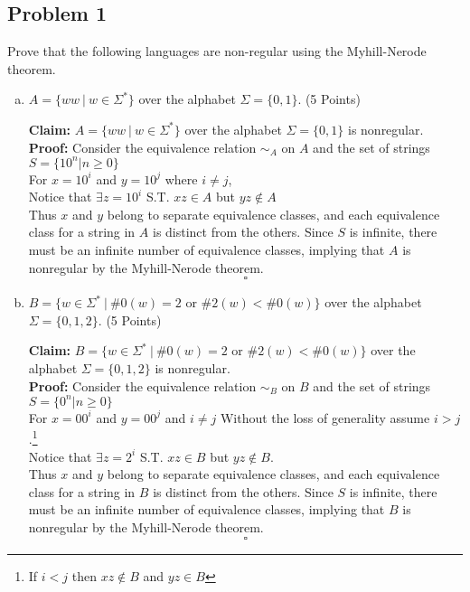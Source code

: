 \documentclass{article}
\begin{document}
\subsection*{Problem 1}
Prove that the following languages are non-regular using the Myhill-Nerode theorem.
\begin{enumerate}[(a)]

\item $A = \{ww\ |\ w \in \Sigma^*\}$ over the alphabet $\Sigma = \{0,1\}$. (5 Points)

\textbf{Claim:}
    $A = \{ww\ |\ w \in \Sigma^*\}$ over the alphabet $\Sigma = \{0,1\}$ is nonregular.\\
\textbf{Proof:}
    Consider the equivalence relation $\sim_A$ on $A$ and the set of strings \\
    $S = \{10^n | n \geq 0 \}$ \\
    For $x = 10^i$ and $y = 10^j$ where $i \neq j$, \\
    Notice that $\exists z = 10^i$ S.T. $xz \in A$ but
    $yz \notin A$ \\
    Thus $x$ and $y$ belong to separate equivalence classes,
    and each equivalence class for a string in
    $A$ is distinct from the others. Since $S$ is infinite, there must be an infinite number of
    equivalence classes, implying that $A$ is nonregular by the Myhill-Nerode theorem.
    \[ \square \]

\item $B = \{w \in \Sigma^*\ |\ \#0(w) = 2 $ or $ \#2(w) < \#0(w)\}$ over the alphabet
    $\Sigma = \{0,1,2\}$. (5 Points)

\textbf{Claim:}
    $B = \{w \in \Sigma^*\ |\ \#0(w) = 2 $ or $ \#2(w) < \#0(w)\}$ over the alphabet
    $\Sigma = \{0,1,2\}$ is nonregular.\\
\textbf{Proof:}
    Consider the equivalence relation $\sim_B$ on $B$ and the set of strings \\
    $S = \{0^n | n \geq 0 \}$ \\
    For $x = 00^i$ and $y = 00^j$ and $i \neq j$ Without the loss of generality assume
    $i > j$.\footnote{If $i < j$ then $xz \notin B$ and $yz \in B$}\\
    Notice that $\exists z=2^i$ S.T. $xz \in B$ but $yz \notin B$. \\
    Thus $x$ and $y$ belong to separate equivalence classes,
    and each equivalence class for a string in
    $B$ is distinct from the others. Since $S$ is infinite, there must be an infinite number of
    equivalence classes, implying that $B$ is nonregular by the Myhill-Nerode theorem.
    \[ \square \]


\end{enumerate}
\end{document}
